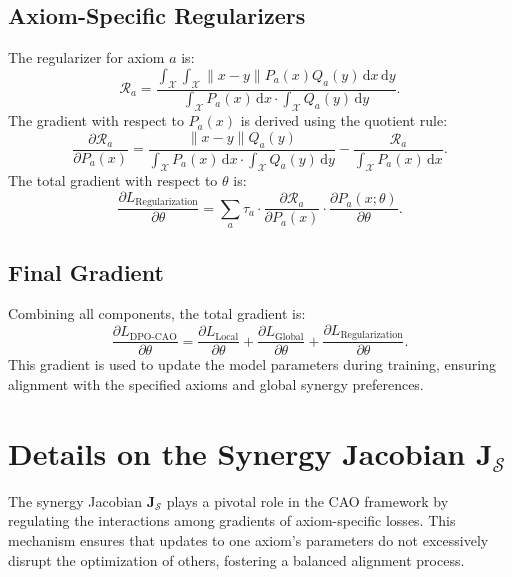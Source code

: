 \subsection{Axiom-Specific Regularizers}
The regularizer for axiom $a$ is:
\[
\mathcal{R}_a = \frac{\int_{\mathcal{X}} \int_{\mathcal{X}} \|x - y\| P_a(x) Q_a(y) \, \mathrm{d}x \, \mathrm{d}y}{\int_{\mathcal{X}} P_a(x) \, \mathrm{d}x \cdot \int_{\mathcal{X}} Q_a(y) \, \mathrm{d}y}.
\]
The gradient with respect to $P_a(x)$ is derived using the quotient rule:
\[
\frac{\partial \mathcal{R}_a}{\partial P_a(x)} = \frac{\|x - y\| Q_a(y)}{\int_{\mathcal{X}} P_a(x) \, \mathrm{d}x \cdot \int_{\mathcal{X}} Q_a(y) \, \mathrm{d}y} - \frac{\mathcal{R}_a}{\int_{\mathcal{X}} P_a(x) \, \mathrm{d}x}.
\]
The total gradient with respect to $\theta$ is:
\[
\frac{\partial L_{\text{Regularization}}}{\partial \theta} = \sum_a \tau_a \cdot \frac{\partial \mathcal{R}_a}{\partial P_a(x)} \cdot \frac{\partial P_a(x; \theta)}{\partial \theta}.
\]

\subsection{Final Gradient}
Combining all components, the total gradient is:
\[
\frac{\partial L_{\text{DPO-CAO}}}{\partial \theta} = \frac{\partial L_{\text{Local}}}{\partial \theta} + \frac{\partial L_{\text{Global}}}{\partial \theta} + \frac{\partial L_{\text{Regularization}}}{\partial \theta}.
\]
This gradient is used to update the model parameters during training, ensuring alignment with the specified axioms and global synergy preferences.


\section{Details on the Synergy Jacobian \(\mathbf{J}_{\mathcal{S}}\)}
\label{sec:appendix_synergy_jacobian}

The synergy Jacobian \(\mathbf{J}_{\mathcal{S}}\) plays a pivotal role in the CAO framework by regulating the interactions among gradients of axiom-specific losses. This mechanism ensures that updates to one axiom’s parameters do not excessively disrupt the optimization of others, fostering a balanced alignment process.


